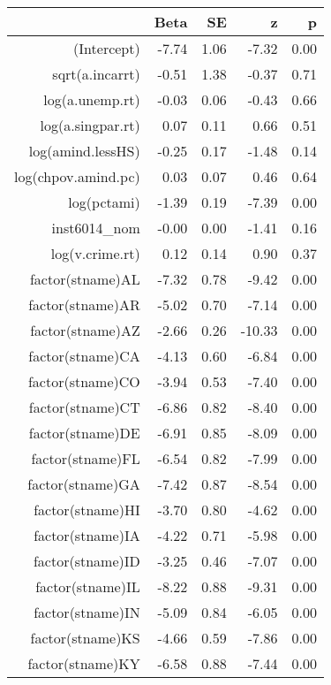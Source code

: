 \begin{table}[ht]
\centering
\begin{tabular}{rrrrr}
  \hline
 & Beta & SE & z & p \\ 
  \hline
(Intercept) & -7.74 & 1.06 & -7.32 & 0.00 \\ 
  sqrt(a.incarrt) & -0.51 & 1.38 & -0.37 & 0.71 \\ 
  log(a.unemp.rt) & -0.03 & 0.06 & -0.43 & 0.66 \\ 
  log(a.singpar.rt) & 0.07 & 0.11 & 0.66 & 0.51 \\ 
  log(amind.lessHS) & -0.25 & 0.17 & -1.48 & 0.14 \\ 
  log(chpov.amind.pc) & 0.03 & 0.07 & 0.46 & 0.64 \\ 
  log(pctami) & -1.39 & 0.19 & -7.39 & 0.00 \\ 
  inst6014\_nom & -0.00 & 0.00 & -1.41 & 0.16 \\ 
  log(v.crime.rt) & 0.12 & 0.14 & 0.90 & 0.37 \\ 
  factor(stname)AL & -7.32 & 0.78 & -9.42 & 0.00 \\ 
  factor(stname)AR & -5.02 & 0.70 & -7.14 & 0.00 \\ 
  factor(stname)AZ & -2.66 & 0.26 & -10.33 & 0.00 \\ 
  factor(stname)CA & -4.13 & 0.60 & -6.84 & 0.00 \\ 
  factor(stname)CO & -3.94 & 0.53 & -7.40 & 0.00 \\ 
  factor(stname)CT & -6.86 & 0.82 & -8.40 & 0.00 \\ 
  factor(stname)DE & -6.91 & 0.85 & -8.09 & 0.00 \\ 
  factor(stname)FL & -6.54 & 0.82 & -7.99 & 0.00 \\ 
  factor(stname)GA & -7.42 & 0.87 & -8.54 & 0.00 \\ 
  factor(stname)HI & -3.70 & 0.80 & -4.62 & 0.00 \\ 
  factor(stname)IA & -4.22 & 0.71 & -5.98 & 0.00 \\ 
  factor(stname)ID & -3.25 & 0.46 & -7.07 & 0.00 \\ 
  factor(stname)IL & -8.22 & 0.88 & -9.31 & 0.00 \\ 
  factor(stname)IN & -5.09 & 0.84 & -6.05 & 0.00 \\ 
  factor(stname)KS & -4.66 & 0.59 & -7.86 & 0.00 \\ 
  factor(stname)KY & -6.58 & 0.88 & -7.44 & 0.00 \\ 

\end{tabular}
\end{table}
